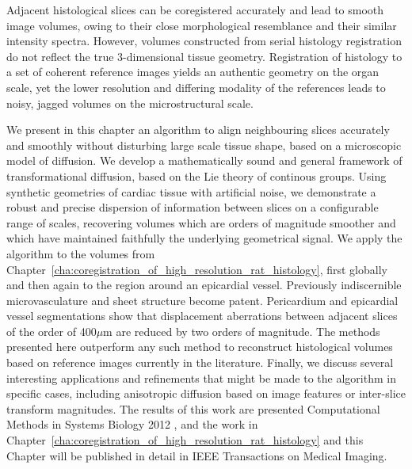 Adjacent histological slices can be coregistered accurately and lead to smooth image volumes, owing to their close morphological resemblance and their similar intensity spectra. However, volumes constructed from serial histology registration do not reflect the true 3-dimensional tissue geometry. Registration of histology to a set of coherent reference images yields an authentic geometry on the organ scale, yet the lower resolution and differing modality of the references leads to noisy, jagged volumes on the microstructural scale.

We present in this chapter an algorithm to align neighbouring slices accurately and smoothly without disturbing large scale tissue shape, based on a microscopic model of diffusion. We develop a mathematically sound and general framework of transformational diffusion, based on the Lie theory of continous groups. Using synthetic geometries of cardiac tissue with artificial noise, we demonstrate a robust and precise dispersion of information between slices on a configurable range of scales, recovering volumes which are orders of magnitude smoother and which have maintained faithfully the underlying geometrical signal. We apply the algorithm to the volumes from Chapter~\ref{cha:coregistration_of_high_resolution_rat_histology}, first globally and then again to the region around an epicardial vessel. Previously indiscernible microvasculature and sheet structure become patent. Pericardium and epicardial vessel segmentations show that displacement aberrations between adjacent slices of the order of 400$\mu$m are reduced by two orders of magnitude. The methods presented here outperform any such method to reconstruct histological volumes based on reference images currently in the literature. Finally, we discuss several interesting applications and refinements that might be made to the algorithm in specific cases, including anisotropic diffusion based on image features or inter-slice transform magnitudes. The results of this work are presented Computational Methods in Systems Biology 2012 \cite{Gibb2012}, and the work in Chapter~\ref{cha:coregistration_of_high_resolution_rat_histology} and this Chapter will be published in detail in IEEE Transactions on Medical Imaging.
